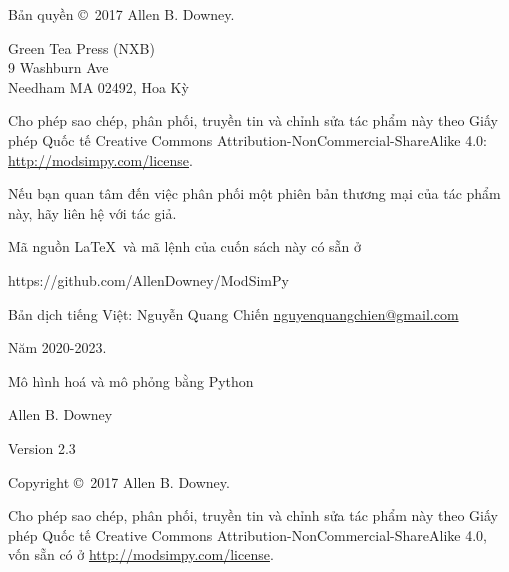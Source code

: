 \documentclass[12pt, openany]{book}
\newcommand{\thetitle}{Mô hình hoá và mô phỏng bằng Python}
\newcommand{\theauthors}{Allen B. Downey}
\newcommand{\theversion}{2.3}
\theoremstyle{exercise}
\begin{document}
\begin{latexonly}
\pagebreak
\thispagestyle{empty}

Bản quyền \copyright ~2017 \theauthors.



\vspace{0.2in}

\begin{flushleft}
Green Tea Press (NXB)       \\
9 Washburn Ave \\
Needham MA 02492, Hoa Kỳ
\end{flushleft}

Cho phép sao chép, phân phối, truyền tin và chỉnh sửa tác phẩm này theo Giấy phép Quốc tế Creative Commons Attribution-NonCommercial-ShareAlike 4.0: \url{http://modsimpy.com/license}.


Nếu bạn quan tâm đến việc phân phối một phiên bản thương mại của tác phẩm này, hãy liên hệ với tác giả.

Mã nguồn \LaTeX\ và mã lệnh của cuốn sách này có sẵn ở

\begin{code}
https://github.com/AllenDowney/ModSimPy
\end{code}

Bản dịch tiếng Việt: Nguyễn Quang Chiến \url{nguyenquangchien@gmail.com}

Năm 2020-2023.


\cleardoublepage
\setcounter{tocdepth}{1}
\tableofcontents

\end{latexonly}



\begin{htmlonly}

\vspace{1em}

{\Large \thetitle}

{\large \theauthors}

Version \theversion

\vspace{1em}

Copyright \copyright ~2017 \theauthors.

Cho phép sao chép, phân phối, truyền tin và chỉnh sửa tác phẩm này theo Giấy phép Quốc tế Creative Commons Attribution-NonCommercial-ShareAlike 4.0, vốn sẵn có ở \url{http://modsimpy.com/license}.

\vspace{1em}

\setcounter{chapter}{-1}

\end{htmlonly}
\end{document}

